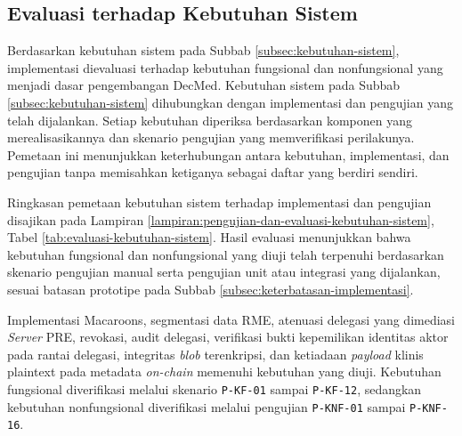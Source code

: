 \subsection{Evaluasi terhadap Kebutuhan Sistem}
\label{subsec:evaluasi-kebutuhan-sistem}

Berdasarkan kebutuhan sistem pada Subbab \ref{subsec:kebutuhan-sistem}, implementasi dievaluasi terhadap kebutuhan fungsional dan nonfungsional yang menjadi dasar pengembangan DecMed. Kebutuhan sistem pada Subbab \ref{subsec:kebutuhan-sistem} dihubungkan dengan implementasi dan pengujian yang telah dijalankan. Setiap kebutuhan diperiksa berdasarkan komponen yang merealisasikannya dan skenario pengujian yang memverifikasi perilakunya. Pemetaan ini menunjukkan keterhubungan antara kebutuhan, implementasi, dan pengujian tanpa memisahkan ketiganya sebagai daftar yang berdiri sendiri.

Ringkasan pemetaan kebutuhan sistem terhadap implementasi dan pengujian disajikan pada Lampiran \ref{lampiran:pengujian-dan-evaluasi-kebutuhan-sistem}, Tabel \ref{tab:evaluasi-kebutuhan-sistem}. Hasil evaluasi menunjukkan bahwa kebutuhan fungsional dan nonfungsional yang diuji telah terpenuhi berdasarkan skenario pengujian manual serta pengujian unit atau integrasi yang dijalankan, sesuai batasan prototipe pada Subbab \ref{subsec:keterbatasan-implementasi}.

Implementasi Macaroons, segmentasi data RME, atenuasi delegasi yang dimediasi \textit{Server} PRE, revokasi, audit delegasi, verifikasi bukti kepemilikan identitas aktor pada rantai delegasi, integritas \textit{blob} terenkripsi, dan ketiadaan \textit{payload} klinis plaintext pada metadata \textit{on-chain} memenuhi kebutuhan yang diuji. Kebutuhan fungsional diverifikasi melalui skenario \texttt{P-KF-01} sampai \texttt{P-KF-12}, sedangkan kebutuhan nonfungsional diverifikasi melalui pengujian \texttt{P-KNF-01} sampai \texttt{P-KNF-16}.
